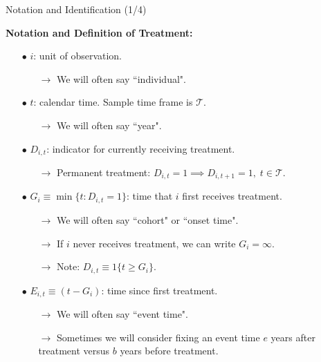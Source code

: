 \documentclass[usenames,dvipsnames]{beamer}
\begin{document}
\begin{frame}{Notation and Identification (1/4)}
 
\vspace{-0.1cm}

\textbf{Notation and Definition of Treatment:}

\vspace{-0.05cm}

\begin{itemize}
\item[$\bullet$] $i$: unit of observation. 
\begin{itemize}
\item[$\rightarrow$]  We will often say ``individual".
\end{itemize}

\vspace{0.1cm}
\item[$\bullet$] $t$: calendar time. Sample time frame is $\mathcal{T}$.
\begin{itemize}
\item[$\rightarrow$] We will often say ``year".
\end{itemize}

\vspace{0.1cm}
\item[$\bullet$] $D_{i,t}$: indicator for currently receiving treatment.
\begin{itemize}
\item[$\rightarrow$] Permanent treatment: $D_{i,t} =1 \implies D_{i,t+1}=1,\; t \in \mathcal{T}$.
\end{itemize}

\vspace{0.1cm}
\item[$\bullet$] $G_i \equiv \min\{t: D_{i,t}=1\}$: time that $i$ first receives  treatment.
\begin{itemize}
\item[$\rightarrow$] We will often say ``cohort" or ``onset time".
\item[$\rightarrow$] If $i$ never receives treatment, we can write $G_i = \infty$. 
\item[$\rightarrow$] Note: $D_{i,t} \equiv 1\{t \geq G_i\}$.
\end{itemize}

\vspace{0.1cm}
\item[$\bullet$] $E_{i,t} \equiv (t - G_{i})$: time since first treatment. 
\begin{itemize}
\item[$\rightarrow$] We will often say ``event time".
\item[$\rightarrow$] Sometimes we will consider fixing an event time $e$ years after treatment versus $b$ years before treatment.
\end{itemize}


\end{itemize}
\end{frame}
\end{document}
